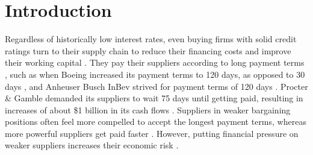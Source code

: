 \documentclass[A4,11pt]{article}
\renewcommand{\~}[1]{\tilde{#1}}
\renewcommand{\-}[1]{\overline{#1}}
\begin{document}
%

\section{Introduction}
Regardless of historically low interest rates, even buying firms with solid credit ratings turn to their supply chain to reduce their financing costs and improve their working capital \citep{Filbeck2016}. They pay their suppliers according to long payment terms \citep{Hu2018}, such as when Boeing increased its payment terms to 120 days, as opposed to 30 days \citep{Scott2016}, and Anheuser Busch InBev strived for payment terms of 120 days \citep{Daneshkhu2015}. Procter \& Gamble demanded its suppliers to wait 75 days until getting paid, resulting in increases of about \$1 billion in its cash flows \citep{Strom2015}. Suppliers in weaker bargaining positions often feel more compelled to accept the longest payment terms, whereas more powerful suppliers get paid faster \citep{Fabbri2016}. However, putting financial pressure on weaker suppliers increases their economic risk \citep{Boissay2007}.
\end{document}
